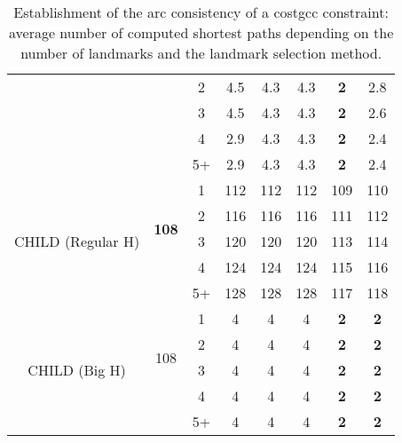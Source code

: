 \begin{table}[h!]
{\begin{tabular}{| c | c || c | c | c | c | c | c |}
               & & 2 & 4.5 & 4.3 & 4.3 & \textbf{2} & 2.8 \\
               & & 3 & 4.5 & 4.3 & 4.3 & \textbf{2} & 2.6 \\
               & & 4 & 2.9 & 4.3 & 4.3 & \textbf{2} & 2.4 \\
               & & 5+ & 2.9 & 4.3 & 4.3 & \textbf{2} & 2.4 \\
         \hline
         \multirow{5}{2.1cm}{CHILD (Regular H)} 
           & \multirow{4}{0.8cm}{\textbf{108}}
               & 1 & 112 & 112 & 112 & 109 & 110 \\
               & & 2 & 116 & 116 & 116 & 111 & 112 \\
               & & 3 & 120 & 120 & 120 & 113 & 114 \\
               & & 4 & 124 & 124 & 124 & 115 & 116 \\
               & & 5+ & 128 & 128 & 128 & 117 & 118 \\
         \hline
         \multirow{5}{2.1cm}{CHILD (Big H)} 
           & \multirow{4}{0.8cm}{108}
               & 1 & 4 & 4 & 4 & \textbf{2} & \textbf{2} \\
               & & 2 & 4 & 4 & 4 & \textbf{2} & \textbf{2} \\
               & & 3 & 4 & 4 & 4 & \textbf{2} & \textbf{2} \\
               & & 4 & 4 & 4 & 4 & \textbf{2} & \textbf{2} \\
               & & 5+ & 4 & 4 & 4 & \textbf{2} & \textbf{2} \\
         \hline
    \end{tabular}
    }
    \caption{Establishment of the arc consistency of a costgcc constraint: average number of computed shortest paths
    depending on the number of landmarks and the landmark selection method.}
    \label{tab:numberOfShortestPath}
\end{table}

